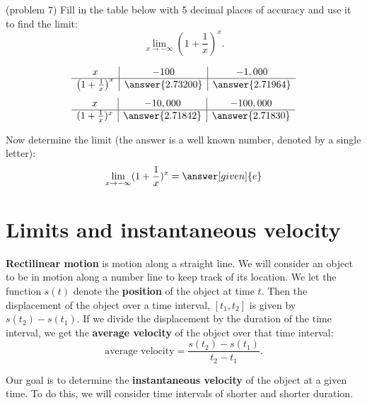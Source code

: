 \documentclass{ximera}
\begin{document}
\begin{problem}(problem 7)
Fill in the table below with 5 decimal places of accuracy and use it to find the limit:
\[\lim_{x \to -\infty} \left(1+\frac{1}{x}\right)^x.\]

\begin{prompt}
\begin{center}
\[
\begin{array}{ c | c | c }
  x & -100 & -1,000   \\ 
	\hline 
	 \left(1+\frac{1}{x}\right)^x & \answer{2.73200} & \answer{2.71964} 
\end{array}
\]
\[
\begin{array}{ c | c | c  }
  x  & -10,000 & -100,000 \\ 
	\hline 
	 (1+\frac{1}{x})^x  & \answer{2.71842} & \answer{2.71830}
\end{array}
\]
\end{center}
Now determine the limit (the answer is a well known number, denoted by a single letter):
\[
\lim_{x \to -\infty} (1+\frac{1}{x})^x = \answer[given]{e}
\]
\end{prompt}
\end{problem}



\section{Limits and instantaneous velocity}


\textbf{Rectilinear motion} is motion along a straight line. We will consider an object to be in motion along a number line to keep track of its location.
We let the function $s(t)$ denote the \textbf{position} of the object at time $t$. Then the displacement of the object over a time interval,
$[t_1, t_2]$ is given by $s(t_2) - s(t_1)$.  If we divide the displacement by the duration of the time interval, we get the 
\textbf{average velocity} of the object over that time interval:
\[
\text{average velocity} = \frac{s(t_2) - s(t_1)}{t_2 -t_1}.
\]


Our goal is to determine the \textbf{instantaneous velocity} of the 
object at a given time.  To do this, we will consider time intervals of shorter and shorter duration.
\end{document}
